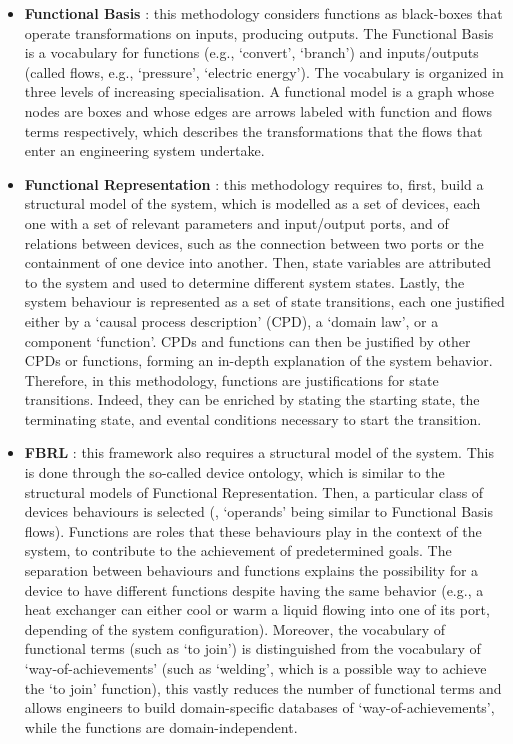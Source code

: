 \documentclass[
]{ceurart}
\begin{document}
\begin{itemize}
    \item \textbf{Functional Basis} \cite{hirtz_functional_2002,stone_development_2000}: this methodology considers functions as black-boxes that operate transformations on inputs, producing outputs. The Functional Basis is a vocabulary for functions (e.g., `convert', `branch') and inputs/outputs (called flows, e.g., `pressure', `electric energy'). The vocabulary is organized in three levels of increasing specialisation. A functional model is a graph whose nodes are boxes and whose edges are arrows labeled with function and flows terms respectively, which describes the transformations that the flows that enter an engineering system undertake.
    \item \textbf{Functional Representation} \cite{chandrasekaranFunctionalRepresentationDesign1993}: this methodology requires to, first, build a structural model of the system, which is modelled as a set of devices, each one with a set of relevant parameters and input/output ports, and of relations between devices, such as the connection between two ports or the containment of one device into another. Then, state variables are attributed to the system and used to determine different system states. Lastly, the system behaviour is represented as a set of state transitions, each one justified either by a `causal process description' (CPD), a `domain law', or a component `function'. CPDs and functions can then be justified by other CPDs or functions, forming an in-depth explanation of the system behavior. Therefore, in this methodology, functions are justifications for state transitions. Indeed, they can be enriched by stating the starting state, the terminating state, and evental conditions necessary to start the transition.
    \item \textbf{FBRL} \cite{sasajimaFBRLFunctionBehavior1995, kitamuraOntologicalModelDevice2006}: this framework also requires a structural model of the system. This is done through the so-called device ontology, which is similar to the structural models of Functional Representation. Then, a particular class of devices behaviours is selected (, `operands' being similar to Functional Basis flows). Functions are roles that these behaviours play in the context of the system, to contribute to the achievement of predetermined goals. The separation between behaviours and functions explains the possibility for a device to have different functions despite having the same behavior (e.g., a heat exchanger can either cool or warm a liquid flowing into one of its port, depending of the system configuration). Moreover, the vocabulary of functional terms (such as `to join') is distinguished from the vocabulary of `way-of-achievements' (such as `welding', which is a possible way to achieve the `to join' function), this vastly reduces the number of functional terms and allows engineers to build domain-specific databases of `way-of-achievements', while the functions are domain-independent. 

\end{itemize}
\end{document}
